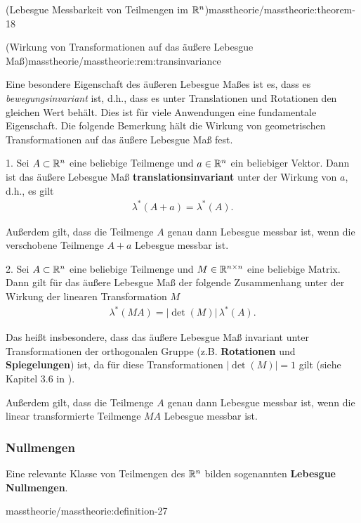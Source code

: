 \begin{theorem}{(Lebesgue Messbarkeit von Teilmengen im \protect\(\mathbb{R}^n\protect\))}{masstheorie/masstheorie:theorem-18}
\begin{remark}{(Wirkung von Transformationen auf das äußere Lebesgue Maß)}{masstheorie/masstheorie:rem:transinvariance}
\par
Eine besondere Eigenschaft des äußeren Lebesgue Maßes ist es, dass es \emph{bewegungsinvariant} ist, d.h., dass es unter Translationen und Rotationen den gleichen Wert behält.
Dies ist für viele Anwendungen eine fundamentale Eigenschaft.
Die folgende Bemerkung hält die Wirkung von geometrischen Transformationen auf das äußere Lebesgue Maß fest.

\par
1. Sei \(A \subset \mathbb{R}^n\) eine beliebige Teilmenge und \(a \in \mathbb{R}^n\) ein beliebiger Vektor.
Dann ist das äußere Lebesgue Maß \textbf{translationsinvariant} unter der Wirkung von \(a\), d.h., es gilt
\begin{align*}
\lambda^*(A + a) = \lambda^*(A).
\end{align*}
\par
Außerdem gilt, dass die Teilmenge \(A\) genau dann Lebesgue messbar ist, wenn die verschobene Teilmenge \(A + a\) Lebesgue messbar ist.

\par
2. Sei \(A \subset \mathbb{R}^n\) eine beliebige Teilmenge und \(M \in \mathbb{R}^{n\times n}\) eine beliebige Matrix.
Dann gilt für das äußere Lebesgue Maß der folgende Zusammenhang unter der Wirkung der linearen Transformation \(M\)
\begin{align*}
\lambda^*(MA) = |\!\operatorname{det}(M)| \, \lambda^*(A).
\end{align*}
\par
Das heißt insbesondere, dass das äußere Lebesgue Maß invariant unter Transformationen der orthogonalen Gruppe (z.B. \textbf{Rotationen} und \textbf{Spiegelungen}) ist, da für diese Transformationen \(|\!\operatorname{det}(M)| = 1\) gilt (siehe Kapitel 3.6 in \cite{Ten21}).

\par
Außerdem gilt, dass die Teilmenge \(A\) genau dann Lebesgue messbar ist, wenn die linear transformierte Teilmenge \(MA\) Lebesgue messbar ist.
\end{remark}


\subsubsection{Nullmengen}
\label{\detokenize{masstheorie/masstheorie:nullmengen}}
\par
Eine relevante Klasse von Teilmengen des \(\mathbb{R}^n\) bilden sogenannten \textbf{Lebesgue Nullmengen}.
\begin{definition}{}{masstheorie/masstheorie:definition-27}




\end{definition}
\end{theorem}
